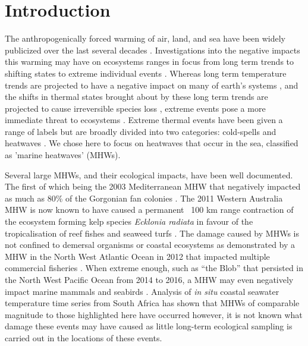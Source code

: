\documentclass[a4paper,10pt,review]{elsarticle}
\begin{document}
\section{Introduction}
The anthropogenically forced warming of air, land, and sea have been widely publicized over the last several decades \citep[e.g.][]{Manabe1967, Sawyer1972, Hansen1981, Cox2000, Rosenzweig2008}. Investigations into the negative impacts this warming may have on ecosystems ranges in focus from long term trends \citep[e.g.][]{Scavia2002, Walther2002, Burrows2011} to shifting states \citep[e.g.][]{Travis2003, Grebmeier2006, Blamey2015} to extreme individual events \citep[e.g.][]{Easterling2000, Barrett2008, Wernberg2012a}. Whereas long term temperature trends are projected to have a negative impact on many of earth's systems \citep{IPCC2014}, and the shifts in thermal states brought about by these long term trends are projected to cause irreversible species loss \citep{Thomas2004}, extreme events pose a more immediate threat to ecosystems \citep[e.g.][]{Jolly2005, Denny2009, Hufkens2012}. Extreme thermal events have been given a range of labels but are broadly divided into two categories: cold-spells \citep[e.g.][]{Gunter1941, Lirman2011, Boucek2016} and heatwaves \citep[e.g.][]{Gordon1988, Stott2004, Perkins-Kirkpatrick2016}. We chose here to focus on heatwaves that occur in the sea, classified as 'marine heatwaves' (MHWs).

Several large MHWs, and their ecological impacts, have been well documented. The first of which being the 2003 Mediterranean MHW that negatively impacted as much as 80\% of the Gorgonian fan colonies \citep{Garrabou2009}. The 2011 Western Australia MHW is now known to have caused a permanent ~100 km range contraction of the ecosystem forming kelp species \emph{Ecklonia radiata} in favour of the tropicalisation of reef fishes and seaweed turfs \citep{Wernberg2016}. The damage caused by MHWs is not confined to demersal organisms or coastal ecosystems as demonstrated by a MHW in the North West Atlantic Ocean in 2012 that impacted multiple commercial fisheries \citep{Mills2013}. When extreme enough, such as ``the Blob'' that persisted in the North West Pacific Ocean from 2014 to 2016, a MHW may even negatively impact marine mammals and seabirds \citep{Cavole2016}. Analysis of \emph{in situ} coastal seawater temperature time series from South Africa has shown that MHWs of comparable magnitude to those highlighted here have occurred \citep{Schlegel2017} however, it is not known what damage these events may have caused as little long-term ecological sampling is carried out in the locations of these events.
\end{document}
